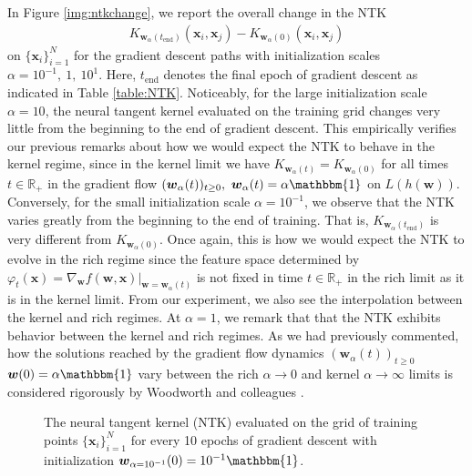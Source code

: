 \documentclass{article}
\begin{document}
In Figure \ref{img:ntkchange}, we report the overall change in the NTK
\begin{align*}
   K_{\boldsymbol{w}_{\alpha}(t_{\text{end}})}(\boldsymbol{x}_i, \boldsymbol{x}_j) -  K_{\boldsymbol{w}_{\alpha}(0)}(\boldsymbol{x}_i, \boldsymbol{x}_j)
\end{align*}
on $\{ \boldsymbol{x}_i \}_{i=1}^N$ for the gradient descent paths with initialization scales $\alpha = 10^{-1}, \ 1, \ 10^1$. Here, $t_{\text{end}}$ denotes the final epoch of gradient descent as indicated in Table \ref{table:NTK}. Noticeably, for the large initialization scale $\alpha = 10$, the neural tangent kernel evaluated on the training grid changes very little from the beginning to the end of gradient descent. This empirically verifies our previous remarks about how we would expect the NTK to behave in the kernel regime, since in the kernel limit we have $K_{\boldsymbol{w}_{\alpha}(t)} = K_{\boldsymbol{w}_{\alpha}(0)}$ for all times $t \in \mathbb{R}_+$ in the gradient flow $(\boldsymbol{w}_{\alpha}(t))_{t \geq 0}, \ \boldsymbol{w}_{\alpha}(t) = \alpha \mathbbm{1}$ on $L(h(\boldsymbol{w}))$. Conversely, for the small initialization scale $\alpha = 10^{-1}$, we observe that the NTK varies greatly from the beginning to the end of training. That is, $K_{\boldsymbol{w}_{\alpha}(t_{\text{end}})}$ is very different from $K_{\boldsymbol{w}_{\alpha}(0)}$. Once again, this is how we would expect the NTK to evolve in the rich regime since the feature space determined by $\varphi_t(\boldsymbol{x}) = \nabla_{\boldsymbol{w}}f(\boldsymbol{w}, \boldsymbol{x})|_{\boldsymbol{w} = \boldsymbol{w}_{\alpha}(t)}$ is not fixed in time $t \in \mathbb{R}_+$ in the rich limit as it is in the kernel limit. From our experiment, we also see the interpolation between the kernel and rich regimes. At $\alpha = 1$, we remark that that the NTK exhibits behavior between the kernel and rich regimes. As we had previously commented, how the solutions reached by the gradient flow dynamics $(\boldsymbol{w}_{\alpha}(t))_{t \geq 0}$ $\boldsymbol{w}(0) = \alpha \mathbbm{1}$ vary between the rich $\alpha \rightarrow 0$ and kernel $\alpha \rightarrow \infty$ limits is considered rigorously by Woodworth and colleagues \cite{woodworth2020kernel}.

\begin{figure}[H]
\caption{The neural tangent kernel (NTK) evaluated on the grid of training points $\{ \boldsymbol{x}_i \}_{i=1}^N$ for every 10 epochs of gradient descent with initialization $\boldsymbol{w}_{\alpha = 10^{-1}}(0) = 10^{-1}\mathbbm{1}$.}\label{gif:ntk1}
\end{figure}
\end{document}
